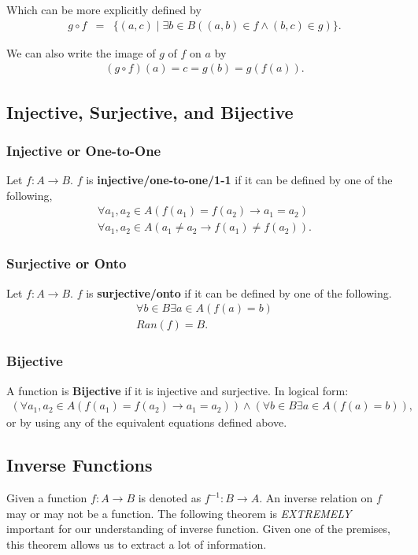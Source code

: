 \documentclass{article}
\begin{document}
\noindent Which can be more explicitly defined by
\begin{eqnarray*}
    g \circ f &=& \{ (a,c) \; | \; \exists b \in B ((a,b) \in f \land (b,c) \in g) \}.
\end{eqnarray*}

\noindent We can also write the image of $g$ of $f$ on $a$ by
\begin{eqnarray*}
    (g \circ f)(a) = c = g(b) = g(f(a)).
\end{eqnarray*}

\subsection{Injective, Surjective, and Bijective}
\subsubsection{Injective or One-to-One}
Let $f: A \rightarrow B$. $f$ is \textbf{injective/one-to-one/1-1} if it can be defined by one of the following,
\begin{eqnarray*}
    \forall a_1, a_2 \in A (f(a_1) = f(a_2) \rightarrow a_1 = a_2) \\
    \forall a_1, a_2 \in A(a_1 \neq a_2 \rightarrow f(a_1) \neq f(a_2)).
\end{eqnarray*}

\subsubsection{Surjective or Onto}
Let $f: A \rightarrow B$. $f$ is \textbf{surjective/onto} if it can be defined by one of the following.
\begin{eqnarray*}
    \forall b \in B \exists a \in A(f(a) = b) \\
    Ran(f) = B.
\end{eqnarray*}

\subsubsection{Bijective}
A function is \textbf{Bijective} if it is injective and surjective. In logical form:
\begin{eqnarray*}
    (\forall a_1, a_2 \in A (f(a_1) = f(a_2) \rightarrow a_1 = a_2)) \land (\forall b \in B \exists a \in A(f(a) = b)),
\end{eqnarray*}
\noindent or by using any of the equivalent equations defined above.

\subsection{Inverse Functions}
Given a function $f : A \rightarrow B$ is denoted as $f^{-1} : B \rightarrow A$. An inverse relation on $f$ may or may not
be a function. The following theorem is \textit{EXTREMELY} important for our understanding of inverse function. Given one
of the premises, this theorem allows us to extract a lot of information.
\end{document}
